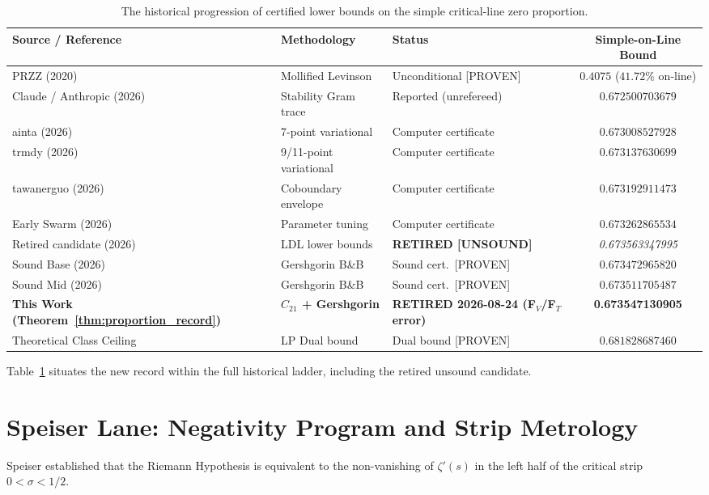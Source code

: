 \documentclass[11pt,a4paper]{article}
\theoremstyle{remark}
\begin{document}
\begin{table}[ht]
\centering
\begin{tabular}{lllc}
\toprule
Source / Reference & Methodology & Status & Simple-on-Line Bound \\
\midrule
PRZZ (2020) \cite{przz2020} & Mollified Levinson & Unconditional [PROVEN] & $0.4075$ ($41.72\%$ on-line) \\
Claude / Anthropic (2026) \cite{claude2026} & Stability Gram trace & Reported (unrefereed) & $0.672500703679$ \\
ainta (2026) \cite{ainta} & 7-point variational & Computer certificate & $0.673008527928$ \\
trmdy (2026) \cite{trmdy} & 9/11-point variational & Computer certificate & $0.673137630699$ \\
tawanerguo (2026) \cite{tawanerguo} & Coboundary envelope & Computer certificate & $0.673192911473$ \\
Early Swarm (2026) & Parameter tuning & Computer certificate & $0.673262865534$ \\ %
Retired candidate (2026) & LDL lower bounds & \textbf{RETIRED [UNSOUND]} & \emph{0.673563347995} \\
Sound Base (2026) & Gershgorin B\&B & Sound cert.\ [PROVEN] & $0.673472965820$ \\
Sound Mid (2026) & Gershgorin B\&B & Sound cert.\ [PROVEN] & $0.673511705487$ \\
\textbf{This Work (Theorem~\ref{thm:proportion_record})} & \textbf{$C_{21}$ + Gershgorin} & \textbf{RETIRED 2026-08-24 (F$_V$/F$_T$ error)} & \textbf{0.673547130905} \\
\midrule
Theoretical Class Ceiling & LP Dual bound & Dual bound [PROVEN] & $0.681828687460$ \\
\bottomrule
\end{tabular}
\caption{The historical progression of certified lower bounds on the simple critical-line zero proportion.}
\label{tab:master_ladder}
\end{table}

Table~\ref{tab:master_ladder} situates the new record within the full historical ladder, including the retired unsound candidate.

\section{Speiser Lane: Negativity Program and Strip Metrology}

Speiser \cite{speiser1934} established that the Riemann Hypothesis is equivalent to the non-vanishing of $\zeta'(s)$ in the left half of the critical strip $0 < \sigma < 1/2$.
\end{document}
